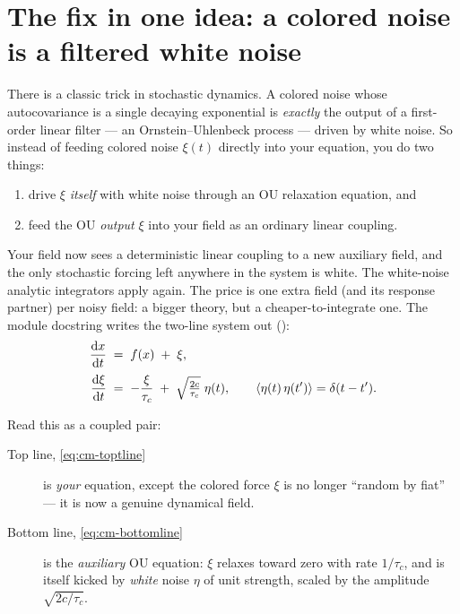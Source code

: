 \section{The fix in one idea: a colored noise is a filtered white noise}

There is a classic trick in stochastic dynamics. A colored noise whose
autocovariance is a single decaying exponential is \emph{exactly} the output of a
first-order linear filter --- an Ornstein--Uhlenbeck process --- driven by white
noise. So instead of feeding colored noise $\xi(t)$ directly into your equation,
you do two things:

\begin{enumerate}
  \item drive $\xi$ \emph{itself} with white noise through an OU relaxation
        equation, and
  \item feed the OU \emph{output} $\xi$ into your field as an ordinary linear
        coupling.
\end{enumerate}

Your field now sees a deterministic linear coupling to a new auxiliary field, and
the only stochastic forcing left anywhere in the system is white. The white-noise
analytic integrators apply again. The price is one extra field (and its \msrjd{}
response partner) per noisy field: a bigger theory, but a cheaper-to-integrate
one. The module docstring writes the two-line system out
():
\begin{align}
  \frac{\mathrm{d} x}{\mathrm{d} t}  \;&=\; f(x) \;+\; \xi,
  \label{eq:cm-toptline}\\[2pt]
  \frac{\mathrm{d} \xi}{\mathrm{d} t} \;&=\; -\frac{\xi}{\tau_c}
        \;+\; \sqrt{\tfrac{2c}{\tau_c}}\;\eta(t),
        \qquad \left\langle \eta(t)\,\eta(t') \right\rangle = \delta(t-t').
  \label{eq:cm-bottomline}
\end{align}

Read this as a coupled pair:

\begin{description}
  \item[Top line, \eqref{eq:cm-toptline}] is \emph{your} equation, except the
        colored force $\xi$ is no longer ``random by fiat'' --- it is now a
        genuine dynamical field.
  \item[Bottom line, \eqref{eq:cm-bottomline}] is the \emph{auxiliary} OU
        equation: $\xi$ relaxes toward zero with rate $1/\tau_c$, and is itself
        kicked by \emph{white} noise $\eta$ of unit strength, scaled by the
        amplitude $\sqrt{2c/\tau_c}$.
\end{description}


